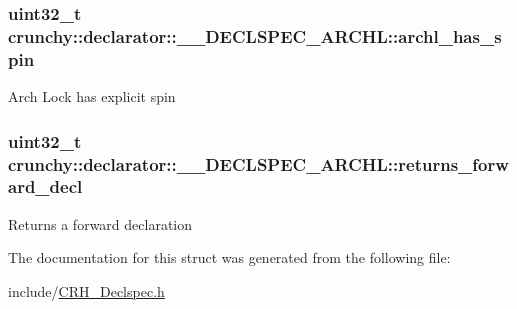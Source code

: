 \subsubsection[{archl\+\_\+has\+\_\+spin}]{\setlength{\rightskip}{0pt plus 5cm}uint32\+\_\+t crunchy\+::declarator\+::\+\_\+\+\_\+\+D\+E\+C\+L\+S\+P\+E\+C\+\_\+\+A\+R\+C\+H\+L\+::archl\+\_\+has\+\_\+spin}\hypertarget{structcrunchy_1_1declarator_1_1_____d_e_c_l_s_p_e_c___a_r_c_h_l_aadc3174237edfc7511f0b8bd94fde0ba}{}\label{structcrunchy_1_1declarator_1_1_____d_e_c_l_s_p_e_c___a_r_c_h_l_aadc3174237edfc7511f0b8bd94fde0ba}
Arch Lock has explicit spin 
\subsubsection[{returns\+\_\+forward\+\_\+decl}]{\setlength{\rightskip}{0pt plus 5cm}uint32\+\_\+t crunchy\+::declarator\+::\+\_\+\+\_\+\+D\+E\+C\+L\+S\+P\+E\+C\+\_\+\+A\+R\+C\+H\+L\+::returns\+\_\+forward\+\_\+decl}\hypertarget{structcrunchy_1_1declarator_1_1_____d_e_c_l_s_p_e_c___a_r_c_h_l_a73a2d868629fed82ad40089b1a7066d4}{}\label{structcrunchy_1_1declarator_1_1_____d_e_c_l_s_p_e_c___a_r_c_h_l_a73a2d868629fed82ad40089b1a7066d4}
Returns a forward declaration 

The documentation for this struct was generated from the following file\+:\begin{DoxyCompactItemize}
\item 
include/\hyperlink{_c_r_h___declspec_8h}{C\+R\+H\+\_\+\+Declspec.\+h}\end{DoxyCompactItemize}
